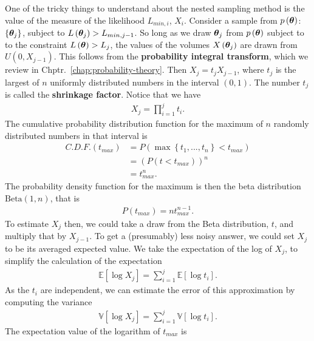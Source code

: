 One of the tricky things to understand about the nested sampling method is the value of the measure of the likelihood $L_{min,i}$, $X_i$.
Consider a sample from $p\left({\bm \theta}\right)$: $\left\{{\bm \theta}_j\right\}$, subject to
$L\left({\bm \theta}_j\right)>L_{min,j-1}$. 
So long as we draw ${\bm \theta}_j$ from $p\left({\bm \theta}\right)$
subject to to the constraint $L\left({\bm \theta}\right)>L_j$,
the values of the volumes $X\left({\bm \theta}_j\right)$ are drawn from $U\left(0,X_{j-1}\right)$.
This follows from the \textbf{probability integral transform}, which we review
in Chptr.~\ref{chap:probability-theory}.
Then $X_j = t_j X_{j-1}$, where $t_j$ is the largest of $n$
uniformly distributed numbers in the interval $(0,1)$.
The number $t_j$ is called the \textbf{shrinkage factor}.
Notice that we have 
\begin{align}
    \label{eq:shrinkage-product}
    X_j = \prod_{i=1}^{j} t_i 
    .
\end{align}
The cumulative probability distribution function for the maximum of $n$ randomly
distributed numbers in that interval is
\begin{align}
    C.D.F.\left(t_{max}\right) 
    &=
    P\left(\max\left\{t_1,...,t_n\right\}<t_{max}\right)
    \nonumber\\
    &=
    \left(P\left(t<t_{max}\right)\right)^n
    \nonumber\\
    &=
    t_{max}^{n}
    .
\end{align}
The probability density function for the maximum is then the beta distribution 
$\mathrm{Beta}\left(1,n\right)$, that is
\begin{align}
    P\left(t_{max}\right) 
    =
    n t_{max}^{n-1}
    .
\end{align}
To estimate $X_j$ then, we could take a draw from the Beta distribution, $t$,
and multiply that by $X_{j-1}$.
To get a (presumably) less noisy answer, we could set $X_j$ to be its averaged
expected value.
We take the expectation of the log of $X_j$, to simplify the calculation of the expectation
\begin{align}
    \mathbb{E}\left[\log X_j\right]
    =
    \sum_{i=1}^j \mathbb{E}\left[\log t_i\right]
    .
\end{align}
As the $t_i$ are independent, we can estimate the error of this approximation by 
computing the variance
\begin{align}
    \mathbb{V}\left[\log X_j\right]
    =
    \sum_{i=1}^j \mathbb{V}\left[\log t_i\right]
    .
\end{align}
The expectation value of the logarithm of $t_{max}$ is
